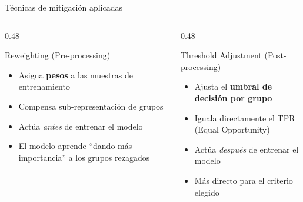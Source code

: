\documentclass[aspectratio=169, 11pt]{beamer}
\begin{document}
\begin{frame}{Técnicas de mitigación aplicadas}
\begin{columns}[T]
\begin{column}{0.48\textwidth}
\begin{block}{\faBalanceScale\quad Reweighting (Pre-processing)}
\begin{itemize}
\item Asigna \textbf{pesos} a las muestras de entrenamiento
\item Compensa sub-representación de grupos
\item Actúa \emph{antes} de entrenar el modelo
\item El modelo aprende ``dando más importancia'' a los grupos rezagados
\end{itemize}
\end{block}
\end{column}
\begin{column}{0.48\textwidth}
\begin{block}{\faSlidersH\quad Threshold Adjustment (Post-processing)}
\begin{itemize}
\item Ajusta el \textbf{umbral de decisión por grupo}
\item Iguala directamente el TPR (Equal Opportunity)
\item Actúa \emph{después} de entrenar el modelo
\item Más directo para el criterio elegido
\end{itemize}
\end{block}
\end{column}
\end{columns}
\vspace{8pt}
\begin{center}
\end{center}
\end{frame}
\end{document}
